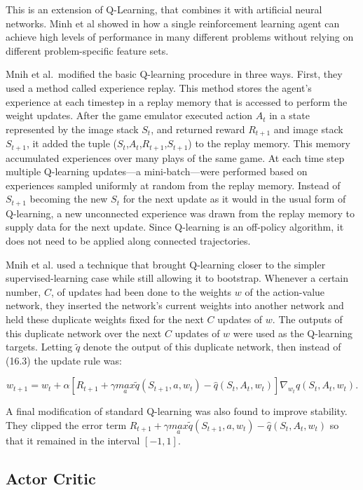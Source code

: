 \documentclass[letterpaper, 10 pt]{IEEEconf}
\begin{document}
This is an extension of Q-Learning, that combines it with artificial
neural networks. Minh et al showed in \cite{minh_dqn} how a single
reinforcement learning agent can achieve high levels of performance in
many different problems without relying on different problem-specific
feature sets.

Mnih et al.\ modified the basic Q-learning procedure in three
ways. First, they used a method called experience replay. This method
stores the agent’s experience at each timestep in a replay memory that
is accessed to perform the weight updates. After the game emulator
executed action $A_t$ in a state represented by the image stack $S_t$,
and returned reward $R_{t+1}$ and image stack $S_{t+1}$, it added the
tuple ($S_t$,$A_t$,$R_{t+1}$,$S_{t+1}$) to the replay memory. This
memory accumulated experiences over many plays of the same game. At
each time step multiple Q-learning updates—a mini-batch—were performed
based on experiences sampled uniformly at random from the replay
memory. Instead of $S_{t+1}$ becoming the new $S_t$ for the next
update as it would in the usual form of Q-learning, a new unconnected
experience was drawn from the replay memory to supply data for the
next update. Since Q-learning is an off-policy algorithm, it does not
need to be applied along connected trajectories.

Mnih et al. used a technique that brought Q-learning closer to the
simpler supervised-learning case while still allowing it to
bootstrap. Whenever a certain number, $C$, of updates had been done to
the weights $w$ of the action-value network, they inserted the
network’s current weights into another network and held these
duplicate weights fixed for the next $C$ updates of $w$. The outputs
of this duplicate network over the next $C$ updates of $w$ were used
as the Q-learning targets. Letting $\tilde{q}$ denote the output of
this duplicate network, then instead of (16.3) the update rule was:

$$
	w_{t+1}=w_t+\alpha[R_{t+1}+\gamma \underset{a}{max} \tilde{q}(S_{t+1},a,w_t)-\hat{q}(S_t,A_t,w_t)]\nabla_{w_t}\hat{q}(S_t,A_t,w_t).
$$

A final modification of standard Q-learning was also found to improve stability. They clipped the error term $R_{t+1}+\gamma \underset{a}{max} \tilde{q}\left(S_{t+1},a,w_t\right)-\hat{q}\left(S_t,A_t,w_t\right)$ so that it remained in the interval $\left[-1,1\right]$.

\subsection{Actor Critic~\cite{konda2000actor}}
\end{document}

